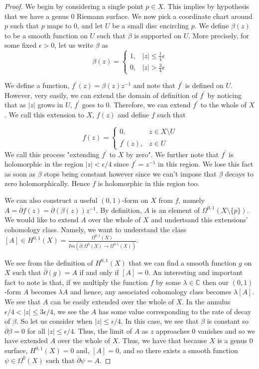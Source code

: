 \documentclass[11pt]{report}
\theoremstyle{definition}
\begin{document}
\begin{proof}
  We begin by considering a single point $p \in X$. This implies by hypothesis that we have a genus $0$ Riemann surface. We now pick a coordinate chart around $p$ such that $p$ maps to $0$, and let $U$ be a small disc encircling $p$. We define $\beta(z)$ to be a smooth function on $U$ such that $\beta$ is supported on $U$. More precisely, for some fixed $\epsilon > 0$, let us write $\beta$ as 
  \[
  \beta(z)=
  \begin{cases}
    1, &|z| \leq \frac{1}{4}\epsilon \\
    0, &|z| > \frac{3}{4}\epsilon
  \end{cases}
  \]
  
  We define a function, $f^{\prime}(z) = \beta(z)z^{-1}$ and note that $f^{\prime}$ is defined on $U$. However, very easily, we can extend the domain of definition of $f^{\prime}$ by noticing that as $|z|$ grows in $U$, $f^{\prime}$ goes to $0$. Therefore, we can extend $f^{\prime}$ to the whole of $X$. We call this extension to $X$, $f(z)$ and define $f$ such that 
  
  \[
    f(z)=
    \begin{cases}
      0, &z \in X \setminus U \\
      f^{\prime}(z), &z \in U
    \end{cases}
    \]
  We call this process "extending $f^{\prime}$ to $X$ by zero". We further note that $f^{\prime}$ is holomorphic in the region $|z| < \epsilon/4$ since $f^{\prime} = z^{-1}$ in this region. We lose this fact as soon as $\beta$ stops being constant however since we can't impose that $\beta$ decays to zero holomorphically. Hence $f$ is holomorphic in this region too.

  We can also construct a useful $(0,1)$-form on $X$ from $f$, namely $A=\overline{\partial}f(z) = \overline{\partial}(\beta(z))z^{-1}$.
  By definition, $A$ is an element of $\Omega^{0,1}(X\setminus \{p\})$. We would like to extend $A$ over the whole of $X$ and undertsand this extensions' cohomology class. Namely, we want to understand the class $[A] \in H^{0,1}(X)=\frac{\Omega^{0,1}(X)}{Im(\overline{\partial}:\Omega^0(X) \rightarrow \Omega^{0,1}(X))}$.


  We see from the definition of $H^{0,1}(X)$ that we can find a smooth function $g$ on $X$ such that $\overline{\partial}(g) = A$ if and only if $[A] = 0$. An interesting and important fact to note is that, if we multiply the function $f$ by some $\lambda \in \mathbb{C}$ then our $(0,1)$-form $A$ becomes $\lambda A$ and hence, any associated cohomology class becomes $\lambda[A]$. We see that $A$ can be easily extended over the whole of $X$. In the annulus $\epsilon /4 < |z| \leq 3\epsilon /4$, we see the $A$ has some value corresponding to the rate of decay of $\beta$. So let us consider when $|z| \leq \epsilon /4$. In this case, we see that $\beta$ is constant so $\overline{\partial}\beta = 0$ for all $|z| \leq \epsilon /4$. Thus, the limit of $A$ as $z$ approaches $0$ vanishes and so we have extended $A$ over the whole of $X$. Thus, we have that because $X$ is a genus $0$ surface, $H^{0,1}(X)=0$ and, $[A] = 0$, and so there exists a smooth function $\psi \in \Omega^0(X)$ such that $\overline{\partial}\psi = A$. 


\end{proof}
\end{document}
